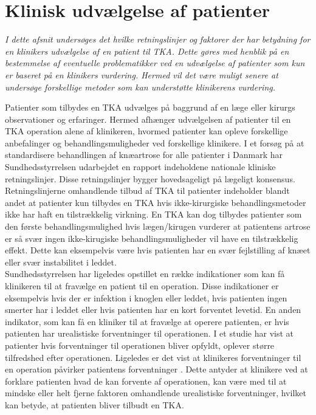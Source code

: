 \section{Klinisk udvælgelse af patienter}
\textit{I dette afsnit undersøges det hvilke retningslinjer og faktorer der har betydning for en klinikers udvælgelse af en patient til TKA. Dette gøres med henblik på en bestemmelse af eventuelle problematikker ved en udvælgelse af patienter som kun er baseret på en klinikers vurdering. Hermed vil det være muligt senere at undersøge forskellige metoder som kan understøtte klinikerens vurdering.}

Patienter som tilbydes en TKA udvælges på baggrund af en læge eller kirurgs observationer og erfaringer.
Hermed afhænger udvælgelsen af patienter til en TKA operation alene af klinikeren, hvormed patienter kan opleve forskellige anbefalinger og behandlingsmuligheder ved forskellige klinikere. I et forsøg på at standardisere behandlingen af knæartrose for alle patienter i Danmark har Sundhedsstyrrelsen udarbejdet en rapport indeholdene nationale kliniske retningslinjer. Disse retningslinjer bygger hovedsageligt på lægeligt konsensus. Retningslinjerne omhandlende tilbud af TKA til patienter indeholder blandt andet at patienter kun tilbydes en TKA hvis ikke-kirurgiske behandlingsmetoder ikke har haft en tilstrækkelig virkning. En TKA kan dog tilbydes patienter som den første behandlingsmulighed hvis lægen/kirugen vurderer at patientens artrose er så svær ingen ikke-kirugiske behandlingsmuligheder vil have en tilstrækkelig effekt. Dette kan eksempelvis være hvis patienten har en svær fejlstilling af knæet eller svær instabilitet i leddet. \citep{brostrom2012} \\
Sundhedsstyrrelsen har ligeledes opstillet en række indikationer som kan få klinikeren til at fravælge en patient til en operation. Disse indikationer er eksempelvis hvis der er infektion i knoglen eller leddet, hvis patienten ingen smerter har i leddet eller hvis patienten har en kort forventet levetid. En anden indikator, som kan få en kliniker til at fravælge at operere patienten, er hvis patienten har urealistiske forventninger til operationen. \citep{brostrom2012} I et studie har \cite{tejada2010} vist at patienter hvis forventninger til operationen bliver opfyldt, oplever større tilfredshed efter operationen. Ligeledes er det vist at klinikeres forventninger til en operation påvirker patientens forventninger \citep{tejada2010}. Dette antyder at klinikere ved at forklare patienten hvad de kan forvente af operationen, kan være med til at mindske eller helt fjerne faktoren omhandlende urealistiske forventninger, hvilket kan betyde, at patienten bliver tilbudt en TKA. \\

